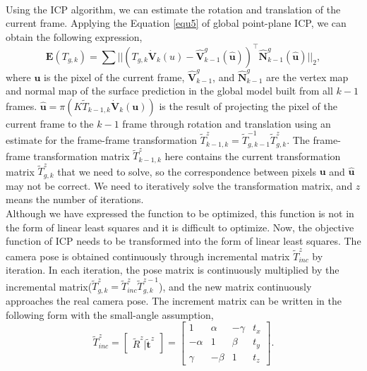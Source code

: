\documentclass[a4paper,12pt]{article}
\begin{document}
\\Using the ICP algorithm, we can estimate the rotation and translation of the current frame. 
Applying the Equation \ref{equ5} of global point-plane ICP, we can obtain the following expression,
\begin{equation}
	\mathbf{E}(T_{g,k}) = \sum||(T_{g,k}\mathbf{\dot{V}}_k(u)-\mathbf{\hat{V}}_{k-1}^g(\mathbf{\hat{u}}))^\top\mathbf{\hat{N}}_{k-1}^g(\hat{\mathbf{u}})||_2,
	\label{equ6}
\end{equation} 
where $\mathbf{u}$ is the pixel of the current frame, $\mathbf{\hat{V}}_{k-1}^g$, and $\mathbf{\hat{N}}_{k-1}^g$ are the vertex map and normal map of the surface prediction in the global model built from all $k-1$ frames.
$\mathbf{\hat{u}}=\pi(K\tilde{T}_{k-1,k}\mathbf{\dot{V}}_k(\mathbf{u}))$ is the result of projecting the pixel of the current frame to the $k-1$ frame through rotation and translation using an estimate for the frame-frame transformation $\tilde{T}_{k-1,k}^z=\tilde{T}_{g,k-1}^{-1}\tilde{T}_{g,k}^z$. 
The frame-frame transformation matrix $\tilde{T}_{k-1,k}^z$ here contains the current transformation matrix $\tilde{T}_{g,k}^z$ that we need to solve, so the correspondence between pixels $\mathbf{u}$ and $\mathbf{\hat{u}}$ may not be correct. 
We need to iteratively solve the transformation matrix, and $z$ means the number of iterations.
\\Although we have expressed the function to be optimized, this function is not in the form of linear least squares and it is difficult to optimize. Now, the objective function of ICP needs to be transformed into the form of linear least squares.
The camera pose is obtained continuously through incremental matrix $\tilde{T}_{inc}^z$ by iteration. In each iteration, the pose matrix is continuously multiplied by the incremental matrix($\tilde{T}_{g,k}^z=\tilde{T}_{inc}^z\tilde{T}_{g,k}^{z-1}$), and the new matrix continuously approaches the real camera pose.
The increment matrix can be written in the following form with the small-angle assumption,
\begin{equation}
	\tilde{T}_{inc}^z = 
	\begin{bmatrix}
		\tilde{R}^z | \tilde{\mathbf{t}}^z 
	\end{bmatrix}
	=
	\begin{bmatrix}
		1&\alpha&-\gamma&t_x\\-\alpha&1&\beta&t_y\\\gamma&-\beta&1&t_z
	\end{bmatrix}.
	\label{equ7}
\end{equation}
\end{document}
